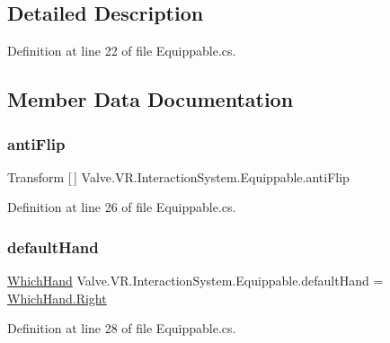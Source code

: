 \subsection{Detailed Description}


Definition at line 22 of file Equippable.\+cs.



\subsection{Member Data Documentation}
\mbox{\label{class_valve_1_1_v_r_1_1_interaction_system_1_1_equippable_aeace94f2573996c91d2e4de5db17f071}} 
\subsubsection{\texorpdfstring{antiFlip}{antiFlip}}
{\footnotesize\ttfamily Transform \mbox{[}$\,$\mbox{]} Valve.\+V\+R.\+Interaction\+System.\+Equippable.\+anti\+Flip}



Definition at line 26 of file Equippable.\+cs.

\mbox{\label{class_valve_1_1_v_r_1_1_interaction_system_1_1_equippable_ae2e7fc6e2e30a5830450289d7ee5af99}} 
\subsubsection{\texorpdfstring{defaultHand}{defaultHand}}
{\footnotesize\ttfamily \mbox{\hyperlink{namespace_valve_1_1_v_r_1_1_interaction_system_a08985e7a537fc13e32e340a15d0b12af}{Which\+Hand}} Valve.\+V\+R.\+Interaction\+System.\+Equippable.\+default\+Hand = \mbox{\hyperlink{namespace_valve_1_1_v_r_1_1_interaction_system_a08985e7a537fc13e32e340a15d0b12afa92b09c7c48c520c3c55e497875da437c}{Which\+Hand.\+Right}}}



Definition at line 28 of file Equippable.\+cs.



